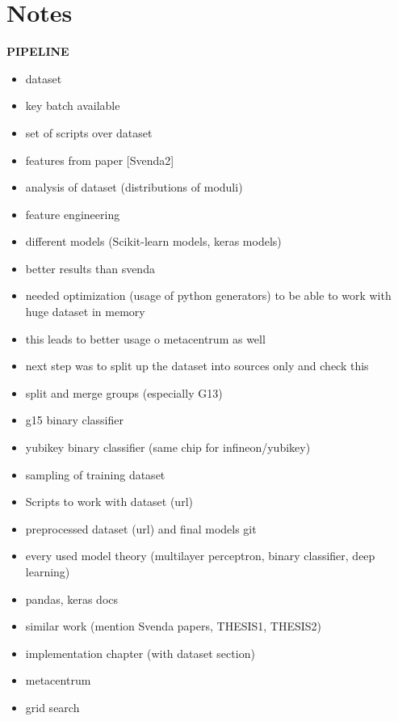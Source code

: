 \chapter{Notes}

\textbf{PIPELINE}
\begin{itemize}

\item dataset
\item key batch available
\item set of scripts over dataset
\item features from paper [Svenda2]
\item analysis of dataset (distributions of moduli)
\item feature engineering
\item different models (Scikit-learn models, keras models)
\item better results than svenda
\item needed optimization (usage of python generators) to be able to work with huge dataset in memory
\item this leads to better usage o metacentrum as well
\item next step was to split up the dataset into sources only and check this
\item split and merge groups (especially G13)
\item g15 binary classifier
\item yubikey binary classifier (same chip for infineon/yubikey)
\item sampling of training dataset 
\item Scripts to work with dataset (url)
\item preprocessed dataset (url) and final models git
\item every used model theory (multilayer perceptron, binary classifier, deep learning)
\item pandas, keras docs
\item similar work (mention Svenda papers, THESIS1, THESIS2)

\item implementation chapter (with dataset section)
\item metacentrum
\item grid search


\end{itemize}